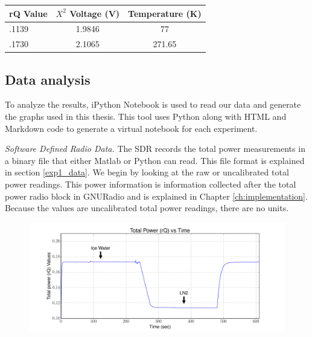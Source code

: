 \begin{table}[h!tb] \centering
{}
\label{exp1_datapoints}
\begin{tabular}{lcc} \hline
\textbf{rQ Value} & \textbf{$X^2$ Voltage (V)} & \textbf{Temperature (K)} \\ \hline
.1139 & 1.9846 & 77 \\
.1730 & 2.1065 & 271.65 \\ \hline
\end{tabular}
\end{table}

\subsection{Data analysis}\label{Exp1_analysis}

To analyze the results, iPython Notebook is used to read our data and generate the graphs used in this thesis.  This tool uses Python along with HTML and Markdown code to generate a virtual notebook for each experiment.  

\emph{Software Defined Radio Data.}  The SDR records the total power measurements in a binary file that either Matlab or Python can read.  This file format is explained in section \ref{exp1_data}.  We begin by looking at the raw or uncalibrated total power readings.  This power information is information collected after the total power radio block in GNURadio and is explained in Chapter \ref{ch:implementation}.  Because the values are uncalibrated total power readings, there are no units.

\begin{figure}[h!tb] \centering
\includegraphics[width=\textwidth]{Experiments/Exp1/rqvstime_annotate.pdf}
\label{SDR_rQ}
\end{figure}


